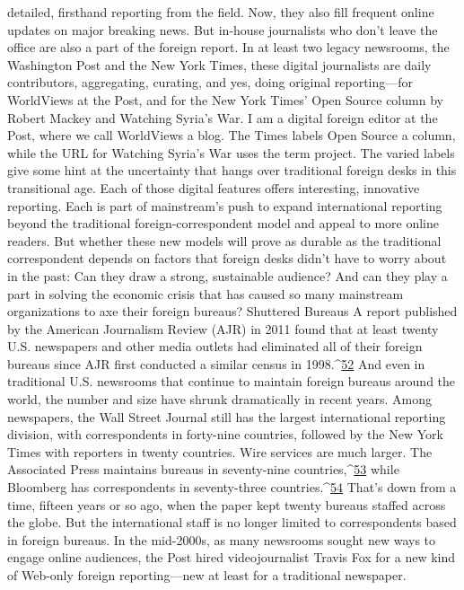 detailed, firsthand reporting from the field. Now, they also fill frequent online updates on
major breaking news. But in-house journalists who don’t leave the office are also a part
of the foreign report. In at least two legacy newsrooms, the Washington Post and the New
York Times, these digital journalists are daily contributors, aggregating, curating, and yes,
doing original reporting—for WorldViews at the Post, and for the New York Times’ Open
Source column by Robert Mackey and Watching Syria’s War.
I am a digital foreign editor at the Post, where we call WorldViews a blog. The Times
labels Open Source a column, while the URL for Watching Syria’s War uses the term
project. The varied labels give some hint at the uncertainty that hangs over traditional
foreign desks in this transitional age. Each of those digital features offers interesting,
innovative reporting. Each is part of mainstream’s push to expand international reporting
beyond the traditional foreign-correspondent model and appeal to more online readers.
But whether these new models will prove as durable as the traditional correspondent
depends on factors that foreign desks didn’t have to worry about in the past: Can they
draw a strong, sustainable audience? And can they play a part in solving the economic
crisis that has caused so many mainstream organizations to axe their foreign bureaus?
Shuttered Bureaus
A report published by the American Journalism Review (AJR) in 2011 found that at least
twenty U.S. newspapers and other media outlets had eliminated all of their foreign
bureaus since AJR first conducted a similar census in 1998.^{\href{#endnotes}{52}} And even in traditional U.S.
newsrooms that continue to maintain foreign bureaus around the world, the number and
size have shrunk dramatically in recent years.
Among newspapers, the Wall Street Journal still has the largest international reporting
division, with correspondents in forty-nine countries, followed by the New York Times
with reporters in twenty countries. Wire services are much larger. The Associated Press
maintains bureaus in seventy-nine countries,^{\href{#endnotes}{53}} while Bloomberg has correspondents in
seventy-three countries.^{\href{#endnotes}{54}}
That’s down from a time, fifteen years or so ago, when the paper kept twenty bureaus
staffed across the globe. But the international staff is no longer limited to correspondents
based in foreign bureaus. In the mid-2000s, as many newsrooms sought new ways to
engage online audiences, the Post hired videojournalist Travis Fox for a new kind of
Web-only foreign reporting—new at least for a traditional newspaper.
